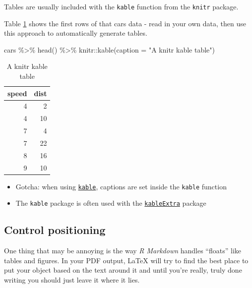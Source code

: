 \documentclass[a4paper, twoside]{templates/ociamthesis}
\providecommand{\tightlist}{%
  \setlength{\itemsep}{0pt}\setlength{\parskip}{0pt}}
\newenvironment{Shaded}{\begin{snugshade}}{\end{snugshade}}
\newcommand{\AttributeTok}[1]{\textcolor[rgb]{0.77,0.63,0.00}{#1}}
\newcommand{\FunctionTok}[1]{\textcolor[rgb]{0.00,0.00,0.00}{#1}}
\newcommand{\NormalTok}[1]{#1}
\newcommand{\SpecialCharTok}[1]{\textcolor[rgb]{0.00,0.00,0.00}{#1}}
\newcommand{\StringTok}[1]{\textcolor[rgb]{0.31,0.60,0.02}{#1}}
\renewenvironment{Shaded}
{
  \vspace{10pt}%
  \begin{snugshade}%
}{%
  \end{snugshade}%
  \vspace{8pt}%
}
\begin{document}
Tables are usually included with the \texttt{kable} function from the \texttt{knitr} package.

Table \ref{tab:cars-table} shows the first rows of that cars data - read in your own data, then use this approach to automatically generate tables.

\begin{Shaded}
\begin{Highlighting}[]
\NormalTok{cars }\SpecialCharTok{\%\textgreater{}\%} 
  \FunctionTok{head}\NormalTok{() }\SpecialCharTok{\%\textgreater{}\%} 
\NormalTok{  knitr}\SpecialCharTok{::}\FunctionTok{kable}\NormalTok{(}\AttributeTok{caption =} \StringTok{"A knitr kable table"}\NormalTok{)}
\end{Highlighting}
\end{Shaded}

\begin{table}

\caption{\label{tab:cars-table}A knitr kable table}
\centering
\begin{tabular}[t]{r|r}
\hline
speed & dist\\
\hline
4 & 2\\
\hline
4 & 10\\
\hline
7 & 4\\
\hline
7 & 22\\
\hline
8 & 16\\
\hline
9 & 10\\
\hline
\end{tabular}
\end{table}

\begin{itemize}
\tightlist
\item
  Gotcha: when using \href{https://www.rdocumentation.org/packages/knitr/versions/1.21/topics/kable}{\texttt{kable}}, captions are set inside the \texttt{kable} function
\item
  The \texttt{kable} package is often used with the \href{https://cran.r-project.org/web/packages/kableExtra/vignettes/awesome_table_in_html.html}{\texttt{kableExtra}} package
\end{itemize}

\hypertarget{control-positioning}{%
\subsection{Control positioning}\label{control-positioning}}

One thing that may be annoying is the way \emph{R Markdown} handles ``floats'' like tables and figures.
In your PDF output, LaTeX will try to find the best place to put your object based on the text around it and until you're really, truly done writing you should just leave it where it lies.
\end{document}
